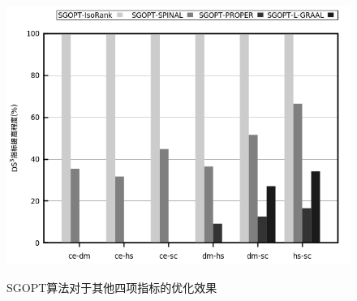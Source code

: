 \begin{figure}[!t]
{\begin{minipage}[b]{0.5\linewidth}
            \includegraphics[width=\linewidth]{pic/improveDS3.png}
            \label{improveDS3}
        \end{minipage}
    }
    \caption{SGOPT算法对于其他四项指标的优化效果}
    \label{improveOther}
\end{figure}


